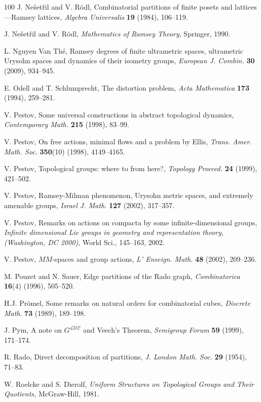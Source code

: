 \begin{thebibliography}{100}
J. Ne\v{s}et\v{r}il and V. R\"odl, Combinatorial partitions of finite posets
and lattices---Ramsey lattices, {\it Algebra Universalis} {\bf 19} (1984),
106--119.

J. Ne\v{s}et\v{r}il and V. R\"odl, {\it Mathematics of Ramsey Theory},
Springer, 1990.

L. Nguyen Van Th\'{e}, Ramsey degrees of finite ultrametric spaces,
ultrametric Urysohn spaces and dynamics of their isometry groups,
{\it European J. Combin.} {\bf 30} (2009), 934--945.

E. Odell and T. Schlumprecht, The distortion problem,
{\it Acta Mathematica} {\bf 173} (1994), 259--281.

V. Pestov, Some universal constructions in abstract topological dynamics,
{\it Contemporary Math.} {\bf 215} (1998), 83--99.

V. Pestov, On free actions, minimal flows and a problem by Ellis, {\it
Trans. Amer. Math. Soc.} {\bf 350}(10) (1998), 4149--4165.

V. Pestov, Topological groups:  where to from here?, {\it Topology
Proceed.} {\bf 24} (1999), 421--502.

V. Pestov, Ramsey-Milman phenomenon, Urysohn metric spaces, and extremely
amenable groups, {\it Israel J. Math.} {\bf 127} (2002), 317--357.

V. Pestov, Remarks on actions on compacta by some infinite-dimensional
groups, {\it Infinite dimensional Lie groups in geometry and representation
theory, (Washington, DC 2000)}, World Sci., 145--163, 2002.

V. Pestov, \(MM\)-spaces and group actions, {\it L' Enseign. Math.}
{\bf 48} (2002), 209--236.

M. Pouzet and N. Sauer, Edge partitions of the Rado graph,
{\it Combinatorica} {\bf 16}(4) (1996), 505--520.

H.J. Pr\"omel, Some remarks on natural orders for combinatorial
cubes, {\it Discrete Math}. {\bf 73} (1989), 189--198.

J. Pym, A note on \(G^{\mathcal L\mathcal U\mathcal C}\) and Veech's Theorem, {\it Semigroup
Forum} {\bf 59} (1999), 171--174.

R. Rado, Direct decomposition of partitions, {\it J. London Math. Soc.}
{\bf 29} (1954), 71--83.

 W. Roelcke and S. Dierolf, {\it Uniform Structures on Topological
Groups and Their Quotients,} McGraw-Hill, 1981.


\end{thebibliography}
